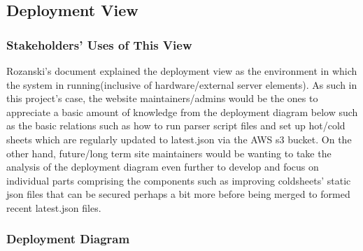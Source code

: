 \subsection{Deployment View}

\subsubsection{Stakeholders' Uses of This View}

Rozanski's document explained the deployment view as the environment in which the system in running(inclusive of hardware/external server elements). As such in this project's case, the website maintainers/admins would be the ones to appreciate a basic amount of knowledge from the deployment diagram below such as the basic relations such as how to run parser script files and set up hot/cold sheets which are regularly updated to latest.json via the AWS s3 bucket. On the other hand, future/long term site maintainers would be wanting to take the analysis of the deployment diagram even further to develop and focus on individual parts comprising the components such as improving coldsheets' static json files that can be secured perhaps a bit more before being merged to formed recent latest.json files.

\subsubsection{Deployment Diagram}

